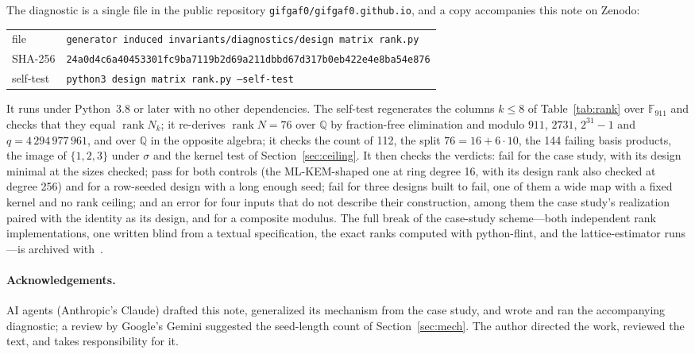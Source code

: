\documentclass[11pt]{article}
\makeatletter
\theoremstyle{remark}
\newcommand{\F}{\mathbb{F}}
\DeclareMathOperator{\rank}{rank}
\DeclareRobustCommand{\_}{%
  \edef\@tempa{\ttdefault}%
  \ifx\f@family\@tempa\char95 \else\textunderscore\fi\penalty300\relax}
\makeatother
\begin{document}
The diagnostic is a single file in the public repository \texttt{gifgaf0/gifgaf0.github.io}, and a copy accompanies
this note on Zenodo:
\begin{center}\small
\begin{tabular}{@{}ll@{}}
file & \texttt{generator\_induced\_invariants/diagnostics/design\_matrix\_rank.py}\\
SHA-256 & \texttt{24a0d4c6a40453301fc9ba7119b2d69a211dbbd67d317b0eb422e4e8ba54e876}\\
self-test & \texttt{python3 design\_matrix\_rank.py --self-test}
\end{tabular}
\end{center}
It runs under Python~3.8 or later with no other dependencies. The self-test regenerates the columns $k\le8$ of
Table~\ref{tab:rank} over $\F_{911}$ and checks that they equal $\rank N_k$; it re-derives $\rank N=76$ over $\mathbb{Q}$
by fraction-free elimination and modulo $911$, $2731$, $2^{31}-1$ and $q=4\,294\,977\,961$, and over $\mathbb{Q}$ in
the opposite algebra; it checks the count of 112, the split $76=16+6\cdot10$, the 144 failing basis products, the image
of $\{1,2,3\}$ under $\sigma$ and the kernel test of Section~\ref{sec:ceiling}. It then checks the verdicts: fail for the
case study, with its design minimal at the sizes checked; pass for both controls (the ML-KEM-shaped one at ring degree
16, with its design rank also checked at degree 256) and for a row-seeded design with a long enough seed; fail for three
designs built to fail, one of them a wide map with a fixed kernel and no rank ceiling; and an error for four inputs that
do not describe their construction, among them the case study's realization paired with the identity as its design, and
for a composite modulus. The full break of the case-study scheme---both independent rank implementations, one written blind from a
textual specification, the exact ranks computed with python-flint, and the lattice-estimator runs---is archived
with~\cite{GifNote}.

\paragraph{Acknowledgements.} AI agents (Anthropic's Claude) drafted this note, generalized its mechanism from the case
study, and wrote and ran the accompanying diagnostic; a review by Google's Gemini suggested the seed-length count of
Section~\ref{sec:mech}. The author directed the work, reviewed the text, and takes responsibility for it.
\end{document}
